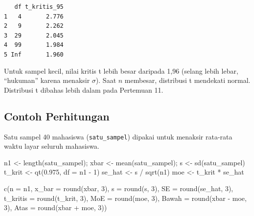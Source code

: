 \documentclass[
  indonesian,
  letterpaper,
]{book}
\newenvironment{Shaded}{\begin{snugshade}}{\end{snugshade}}
\newcommand{\AttributeTok}[1]{\textcolor[rgb]{0.40,0.45,0.13}{#1}}
\newcommand{\DecValTok}[1]{\textcolor[rgb]{0.68,0.00,0.00}{#1}}
\newcommand{\FloatTok}[1]{\textcolor[rgb]{0.68,0.00,0.00}{#1}}
\newcommand{\FunctionTok}[1]{\textcolor[rgb]{0.28,0.35,0.67}{#1}}
\newcommand{\NormalTok}[1]{\textcolor[rgb]{0.00,0.23,0.31}{#1}}
\newcommand{\OtherTok}[1]{\textcolor[rgb]{0.00,0.23,0.31}{#1}}
\newcommand{\SpecialCharTok}[1]{\textcolor[rgb]{0.37,0.37,0.37}{#1}}
\begin{document}
\begin{verbatim}
   df t_kritis_95
1   4       2.776
2   9       2.262
3  29       2.045
4  99       1.984
5 Inf       1.960
\end{verbatim}

Untuk sampel kecil, nilai kritis t lebih besar daripada 1,96 (selang
lebih lebar, ``hukuman'' karena menaksir \(\sigma\)). Saat \(n\)
membesar, distribusi t mendekati normal. Distribusi t dibahas lebih
dalam pada Pertemuan 11.

\subsection{Contoh Perhitungan}\label{contoh-perhitungan}

Satu sampel 40 mahasiswa (\texttt{satu\_sampel}) dipakai untuk menaksir
rata-rata waktu layar seluruh mahasiswa.

\begin{Shaded}
\begin{Highlighting}[]
\NormalTok{n1 }\OtherTok{\textless{}{-}} \FunctionTok{length}\NormalTok{(satu\_sampel); xbar }\OtherTok{\textless{}{-}} \FunctionTok{mean}\NormalTok{(satu\_sampel); s }\OtherTok{\textless{}{-}} \FunctionTok{sd}\NormalTok{(satu\_sampel)}
\NormalTok{t\_krit }\OtherTok{\textless{}{-}} \FunctionTok{qt}\NormalTok{(}\FloatTok{0.975}\NormalTok{, }\AttributeTok{df =}\NormalTok{ n1 }\SpecialCharTok{{-}} \DecValTok{1}\NormalTok{)}
\NormalTok{se\_hat }\OtherTok{\textless{}{-}}\NormalTok{ s }\SpecialCharTok{/} \FunctionTok{sqrt}\NormalTok{(n1)}
\NormalTok{moe    }\OtherTok{\textless{}{-}}\NormalTok{ t\_krit }\SpecialCharTok{*}\NormalTok{ se\_hat}

\FunctionTok{c}\NormalTok{(}\AttributeTok{n =}\NormalTok{ n1, }\AttributeTok{x\_bar =} \FunctionTok{round}\NormalTok{(xbar, }\DecValTok{3}\NormalTok{), }\AttributeTok{s =} \FunctionTok{round}\NormalTok{(s, }\DecValTok{3}\NormalTok{), }\AttributeTok{SE =} \FunctionTok{round}\NormalTok{(se\_hat, }\DecValTok{3}\NormalTok{),}
  \AttributeTok{t\_kritis =} \FunctionTok{round}\NormalTok{(t\_krit, }\DecValTok{3}\NormalTok{), }\AttributeTok{MoE =} \FunctionTok{round}\NormalTok{(moe, }\DecValTok{3}\NormalTok{),}
  \AttributeTok{Bawah =} \FunctionTok{round}\NormalTok{(xbar }\SpecialCharTok{{-}}\NormalTok{ moe, }\DecValTok{3}\NormalTok{), }\AttributeTok{Atas =} \FunctionTok{round}\NormalTok{(xbar }\SpecialCharTok{+}\NormalTok{ moe, }\DecValTok{3}\NormalTok{))}
\end{Highlighting}
\end{Shaded}
\end{document}
